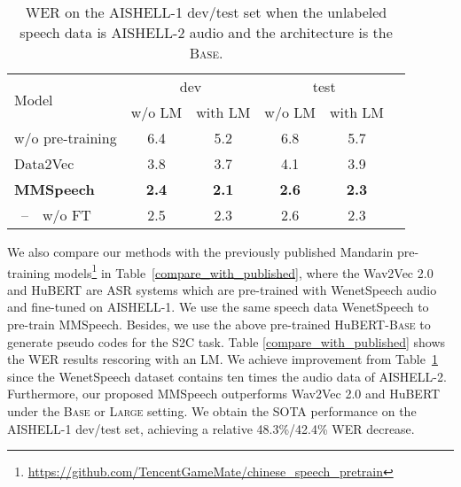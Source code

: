 \documentclass{article}
\begin{document}
\begin{table}[htb]
    \setlength\tabcolsep{4pt}
	\centering
	\caption{WER on the AISHELL-1 dev/test set when the unlabeled speech data is AISHELL-2 audio and the architecture is the \textsc{Base}.}
    \vspace{0.1cm}
    \label{main_reslut}
	\begin{tabular}{l c c c c c}
		\toprule  \multirow{2}{*}{Model} 
		& \multicolumn{2}{c}{dev} & \multicolumn{2}{c}{test} \\
		\cmidrule(lr){2-3} \cmidrule(lr){4-5}
         & w/o LM & with LM & w/o LM & with LM \\
		\midrule  w/o pre-training     & 6.4   & 5.2   & 6.8   & 5.7 \\
        Data2Vec            & 3.8   & 3.7   & 4.1   & 3.9 \\
\textbf{MMSpeech}   & \textbf{2.4} & \textbf{2.1} &\textbf{2.6} & \textbf{2.3} \\
        ~--~~w/o FT           & 2.5   & 2.3   & 2.6   & 2.3 \\
		\bottomrule  \end{tabular}
\end{table}

We also compare our methods with the previously published Mandarin pre-training models\footnote{\href{https://github.com/TencentGameMate/chinese\_speech\_pretrain}{https://github.com/TencentGameMate/chinese\_speech\_pretrain}} in Table~\ref{compare_with_published}, where the Wav2Vec 2.0\cite{baevski2020wav2vec} and HuBERT\cite{hsu2021hubert} are ASR systems which are pre-trained with WenetSpeech audio and fine-tuned on AISHELL-1. 
We use the same speech data WenetSpeech to pre-train MMSpeech. 
Besides, we use the above pre-trained HuBERT-\textsc{Base} to generate pseudo codes for the S2C task.
Table \ref{compare_with_published} shows the WER results rescoring with an LM. We achieve improvement from Table~\ref{main_reslut} since the WenetSpeech dataset contains ten times the audio data of AISHELL-2. Furthermore, our proposed MMSpeech outperforms Wav2Vec 2.0\cite{baevski2020wav2vec} and HuBERT\cite{hsu2021hubert} under the \textsc{Base} or \textsc{Large} setting. We obtain the SOTA performance on the AISHELL-1 dev/test set, achieving a relative 48.3\%/42.4\% WER decrease. 
\end{document}
